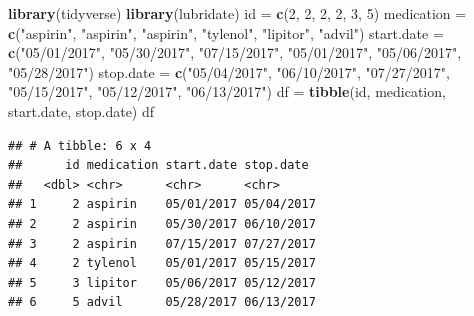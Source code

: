 \documentclass[]{book}
\newenvironment{Shaded}{\begin{snugshade}}{\end{snugshade}}
\newcommand{\CommentTok}[1]{\textcolor[rgb]{0.56,0.35,0.01}{\textit{#1}}}
\newcommand{\DataTypeTok}[1]{\textcolor[rgb]{0.13,0.29,0.53}{#1}}
\newcommand{\DecValTok}[1]{\textcolor[rgb]{0.00,0.00,0.81}{#1}}
\newcommand{\KeywordTok}[1]{\textcolor[rgb]{0.13,0.29,0.53}{\textbf{#1}}}
\newcommand{\NormalTok}[1]{#1}
\newcommand{\OperatorTok}[1]{\textcolor[rgb]{0.81,0.36,0.00}{\textbf{#1}}}
\newcommand{\StringTok}[1]{\textcolor[rgb]{0.31,0.60,0.02}{#1}}
\begin{document}
\begin{Shaded}
\begin{Highlighting}[]
\KeywordTok{library}\NormalTok{(tidyverse)}
\KeywordTok{library}\NormalTok{(lubridate)}
\NormalTok{id =}\StringTok{ }\KeywordTok{c}\NormalTok{(}\DecValTok{2}\NormalTok{, }\DecValTok{2}\NormalTok{, }\DecValTok{2}\NormalTok{, }\DecValTok{2}\NormalTok{, }\DecValTok{3}\NormalTok{, }\DecValTok{5}\NormalTok{) }
\NormalTok{medication =}\StringTok{ }\KeywordTok{c}\NormalTok{(}\StringTok{"aspirin"}\NormalTok{, }\StringTok{"aspirin"}\NormalTok{, }\StringTok{"aspirin"}\NormalTok{, }\StringTok{"tylenol"}\NormalTok{, }\StringTok{"lipitor"}\NormalTok{, }\StringTok{"advil"}\NormalTok{) }
\NormalTok{start.date =}\StringTok{ }\KeywordTok{c}\NormalTok{(}\StringTok{"05/01/2017"}\NormalTok{, }\StringTok{"05/30/2017"}\NormalTok{, }\StringTok{"07/15/2017"}\NormalTok{, }\StringTok{"05/01/2017"}\NormalTok{, }\StringTok{"05/06/2017"}\NormalTok{, }\StringTok{"05/28/2017"}\NormalTok{)}
\NormalTok{stop.date =}\StringTok{ }\KeywordTok{c}\NormalTok{(}\StringTok{"05/04/2017"}\NormalTok{, }\StringTok{"06/10/2017"}\NormalTok{, }\StringTok{"07/27/2017"}\NormalTok{, }\StringTok{"05/15/2017"}\NormalTok{, }\StringTok{"05/12/2017"}\NormalTok{, }\StringTok{"06/13/2017"}\NormalTok{)}
\NormalTok{df =}\StringTok{ }\KeywordTok{tibble}\NormalTok{(id, medication, start.date, stop.date)}
\NormalTok{df}
\end{Highlighting}
\end{Shaded}

\begin{verbatim}
## # A tibble: 6 x 4
##      id medication start.date stop.date 
##   <dbl> <chr>      <chr>      <chr>     
## 1     2 aspirin    05/01/2017 05/04/2017
## 2     2 aspirin    05/30/2017 06/10/2017
## 3     2 aspirin    07/15/2017 07/27/2017
## 4     2 tylenol    05/01/2017 05/15/2017
## 5     3 lipitor    05/06/2017 05/12/2017
## 6     5 advil      05/28/2017 06/13/2017
\end{verbatim}

\begin{Shaded}
\end{Shaded}
\end{document}

